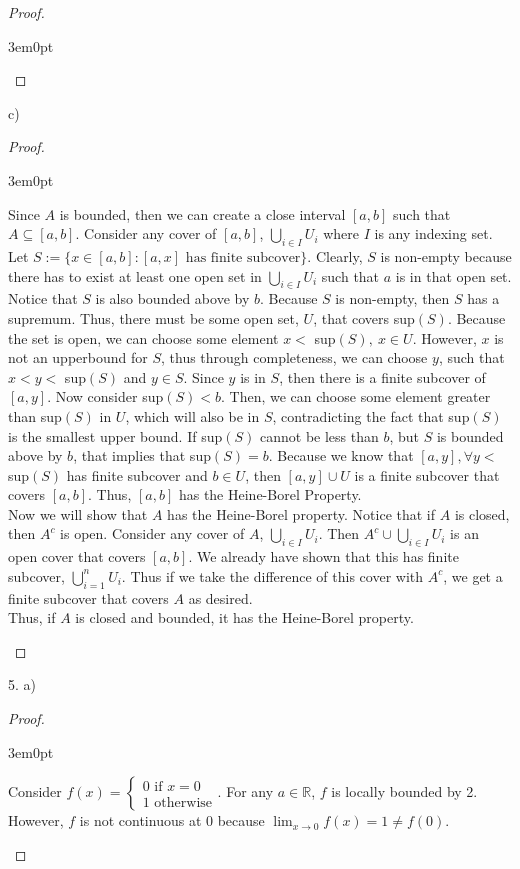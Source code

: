 \documentclass[11pt]{article}
\newcommand{\R}{\mathbb{R}}
\newenvironment{myproof}
{\begin{proof} \begin{adjustwidth}{3em}{0pt}$ $\par\nobreak\ignorespaces}
{\end{adjustwidth} \end{proof}}
\begin{document}
\begin{flushleft}
\begin{myproof}
\end{myproof}

c)

\begin{myproof}

Since $A$ is bounded, then we can create a close interval $[a,b]$ such that $A \subseteq [a,b]$. Consider any cover of $[a,b]$, $\bigcup_{i \in I}U_i$ where $I$ is any indexing set. Let $S := \{ x \in [a,b]:[a,x] \text{ has finite subcover} \}$. Clearly, $S$ is non-empty because there has to exist at least one open set in $\bigcup_{i \in I}U_i$ such that $a$ is in that open set. Notice that $S$ is also bounded above by $b$. Because $S$ is non-empty, then $S$ has a supremum. Thus, there must be some open set, $U$, that covers sup$(S)$. Because the set is open, we can choose some element $x <$ sup$(S), \ x \in U$. However, $x$ is not an upperbound for $S$, thus through completeness, we can choose $y$, such that $x < y <$ sup$(S)$ and $y \in S$. Since $y$ is in $S$, then there is a finite subcover of $[a,y]$. Now consider sup$(S) < b$. Then, we can choose some element greater than sup$(S)$ in $U$, which will also be in $S$, contradicting the fact that sup$(S)$ is the smallest upper bound. If sup$(S)$ cannot be less than $b$, but $S$ is bounded above by $b$, that implies that sup$(S) = b$. Because we know that $[a,y], \forall y <$ sup$(S)$ has finite subcover and $b \in U$, then $[a,y] \cup U$ is a finite subcover that covers $[a,b]$. Thus, $[a,b]$ has the Heine-Borel Property. \\
\bigskip
Now we will show that $A$ has the Heine-Borel property. Notice that if $A$ is closed, then $A^c$ is open. Consider any cover of $A$, $\bigcup_{i \in I}U_i$. Then $A^c \cup \bigcup_{i \in I}U_i$ is an open cover that covers $[a,b]$. We already have shown that this has finite subcover, $\bigcup_{i = 1}^nU_i$. Thus if we take the difference of this cover with $A^c$, we get a finite subcover that covers $A$ as desired. \\
\bigskip
Thus, if $A$ is closed and bounded, it has the Heine-Borel property.

\end{myproof}

\newpage

5. a)

\begin{myproof}

Consider $f(x) = \begin{cases} 0 \text{ if } x = 0 \\ 1 \text{ otherwise} \end{cases}$. For any $a \in \R$, $f$ is locally bounded by 2. However, $f$ is not continuous at 0 because $\lim_{x \to 0} f(x) = 1  \neq f(0)$.


\end{myproof}
\end{flushleft}
\end{document}

